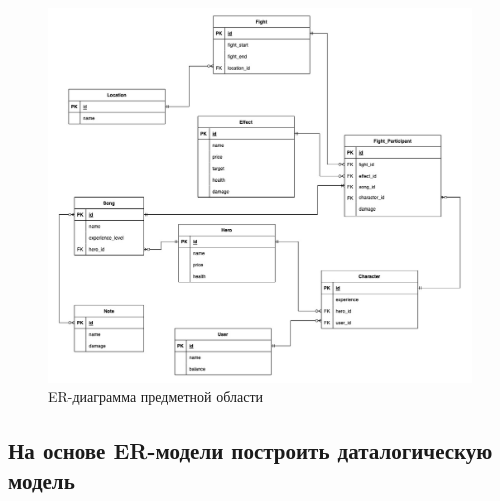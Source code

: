 
\begin{figure}[H]
	\begin{center}
		\includegraphics[scale=0.48]{images/ER.jpg}
		\caption{ER-диаграмма предметной области}
	\end{center}
\end{figure}

\subsection*{На основе ER-модели построить даталогическую модель}


